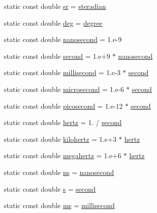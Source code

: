 \begin{DoxyCompactItemize}
\item 
static const double \hyperlink{namespacedd4hep_a873790b393da6dc353009c99dfa88b6e}{sr} = \hyperlink{namespacedd4hep_a0a902cdeced2ad28da2d32515e540867}{steradian}
\item 
static const double \hyperlink{namespacedd4hep_a0601e2b88f6f0cccb407192156174957}{deg} = \hyperlink{namespacedd4hep_a9fbc5184e0fbd4235e8efb28cc3ab3af}{degree}
\item 
static const double \hyperlink{namespacedd4hep_acd3d49e76b85c03111a8bdcaffe4c8c7}{nanosecond} = 1.e-\/9
\item 
static const double \hyperlink{namespacedd4hep_ac03364576705a245265d8ed6ea26b871}{second} = 1.e+9 $\ast$ \hyperlink{namespacedd4hep_acd3d49e76b85c03111a8bdcaffe4c8c7}{nanosecond}
\item 
static const double \hyperlink{namespacedd4hep_ac5b763830694c4ae41e03dc174f1cc79}{millisecond} = 1.e-\/3 $\ast$ \hyperlink{namespacedd4hep_ac03364576705a245265d8ed6ea26b871}{second}
\item 
static const double \hyperlink{namespacedd4hep_a82330b93e44ff2e4bc64471f4fb3387d}{microsecond} = 1.e-\/6 $\ast$ \hyperlink{namespacedd4hep_ac03364576705a245265d8ed6ea26b871}{second}
\item 
static const double \hyperlink{namespacedd4hep_a0ff865b7e95a5b6116c7a5497895bec3}{picosecond} = 1.e-\/12 $\ast$ \hyperlink{namespacedd4hep_ac03364576705a245265d8ed6ea26b871}{second}
\item 
static const double \hyperlink{namespacedd4hep_a5ada76b9ea37d13e1e346f2256017cff}{hertz} = 1. / \hyperlink{namespacedd4hep_ac03364576705a245265d8ed6ea26b871}{second}
\item 
static const double \hyperlink{namespacedd4hep_a047776833f7632dfbfa1b7e4aa17ffd0}{kilohertz} = 1.e+3 $\ast$ \hyperlink{namespacedd4hep_a5ada76b9ea37d13e1e346f2256017cff}{hertz}
\item 
static const double \hyperlink{namespacedd4hep_a67e1a0f3e5d536a61c5b88820e284f6e}{megahertz} = 1.e+6 $\ast$ \hyperlink{namespacedd4hep_a5ada76b9ea37d13e1e346f2256017cff}{hertz}
\item 
static const double \hyperlink{namespacedd4hep_af8ce9b988119cb2c9b6b7397dbb34e97}{ns} = \hyperlink{namespacedd4hep_acd3d49e76b85c03111a8bdcaffe4c8c7}{nanosecond}
\item 
static const double \hyperlink{namespacedd4hep_a016f64f3a4662ba41ea7f04ba2d59ef5}{s} = \hyperlink{namespacedd4hep_ac03364576705a245265d8ed6ea26b871}{second}
\item 
static const double \hyperlink{namespacedd4hep_a75a019cb4a909458c79262a2a401662a}{ms} = \hyperlink{namespacedd4hep_ac5b763830694c4ae41e03dc174f1cc79}{millisecond}

\end{DoxyCompactItemize}
